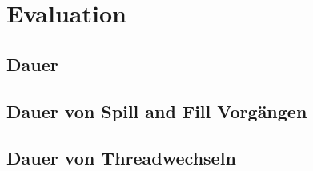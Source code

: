 \chapter{Evaluation}
\label{cha:Evaluation}
\section{Dauer }
\section{Dauer von Spill and Fill Vorg\"angen}
\section{Dauer von Threadwechseln}